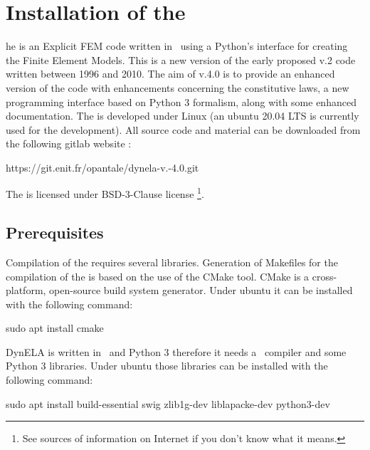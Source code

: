 %
%
%
\chapter{Installation of the \DynELA}\label{Chapter!Installation}

\startcontents[chapters]
\printmyminitoc[2]he \DynELA is an Explicit FEM code written in \Cpp~using a Python's interface for creating the Finite Element Models. This is a new version of the early proposed v.2 code written between 1996 and 2010. The aim of v.4.0 is to provide an enhanced version of the code with enhancements concerning the constitutive laws, a new programming interface based on Python 3 formalism, along with some enhanced documentation.
The \DynELA is developed under Linux (an ubuntu 20.04 LTS is currently used for the development). All source code and material can be downloaded from the following gitlab
 website
:

\hspace*{1cm}\textsf{https://git.enit.fr/opantale/dynela-v.-4.0.git}

The \DynELA is licensed under BSD-3-Clause license \footnote{See sources of information on Internet if you don't know what it means.}.

\section{Prerequisites}

Compilation of the \DynELA requires several libraries.
Generation of Makefiles for the compilation of the \DynELA is based on the use of the CMake tool. CMake is a cross-platform, open-source build system generator. Under ubuntu it can be installed with the following command:

\begin{BashListing}[numbers=none]
sudo apt install cmake
\end{BashListing}

DynELA is written in \Cpp~and Python 3 therefore it needs a \Cpp~compiler and some Python 3 libraries. Under ubuntu those libraries can be installed with the following command:

\begin{BashListing}[numbers=none]
sudo apt install build-essential swig zlib1g-dev liblapacke-dev python3-dev
\end{BashListing}

